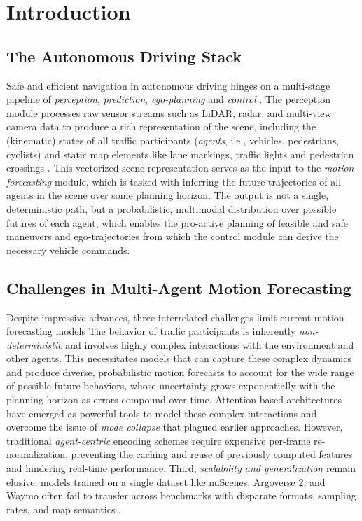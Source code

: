 \section{Introduction}
\label{sect:introduction}

\subsection{The Autonomous Driving Stack}
Safe and efficient navigation in autonomous driving hinges on a multi-stage pipeline of \emph{perception}, \emph{prediction}, \emph{ego-planning} and \emph{control} \cite{hu2023planning}. The perception module processes raw sensor streams such as LiDAR, radar, and multi-view camera data to produce a rich representation of the scene, including the (kinematic) states of all traffic participants (\emph{agents}, i.e., vehicles, pedestrians, cyclists) and static map elements like lane markings, traffic lights and pedestrian crossings \cite{lmformerYadav2025}.
This vectorized scene-representation serves as the input to the \emph{motion forecasting} module, which is tasked with inferring the future trajectories of all agents in the scene over some planning horizon. The output is not a single, deterministic path, but a probabilistic, multimodal distribution over possible futures of each agent, which enables the pro-active planning of feasible and safe maneuvers and ego-trajectories from which the control module can derive the necessary vehicle commands.

\subsection{Challenges in Multi-Agent Motion Forecasting}
Despite impressive advances, three interrelated challenges limit current motion forecasting models
The behavior of traffic participants is inherently \emph{non-deterministic} and involves highly complex interactions with the environment and other agents. This necessitates models that can capture these complex dynamics and produce diverse, probabilistic motion forecasts to account for the wide range of possible future behaviors, whose uncertainty grows exponentially with the planning horizon as errors compound over time.
Attention-based architectures have emerged as powerful tools to model these complex interactions and overcome the issue of \emph{mode collapse} that plagued earlier approaches. However, traditional \emph{agent-centric} encoding schemes require expensive per-frame re-normalization, preventing the caching and reuse of previously computed features and hindering real-time performance\cite{qcnextZhou2023}.
Third, \emph{scalability and generalization} remain elusive: models trained on a single dataset like nuScenes, Argoverse 2, and Waymo \cite{caesar2020nuscenes, av2Wilson2023, wmodSun2020} often fail to transfer across benchmarks with disparate formats, sampling rates, and map semantics \cite{unitrajFeng2024}.

